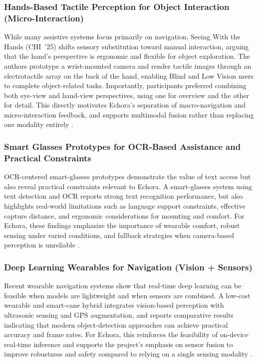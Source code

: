 \subsubsection{Hands-Based Tactile Perception for Object Interaction (Micro-Interaction)}
\label{subsec:lit_hands}

While many assistive systems focus primarily on navigation, Seeing With the Hands (CHI~’25) shifts sensory substitution toward manual interaction, arguing that the hand’s perspective is ergonomic and flexible for object exploration. The authors prototype a wrist-mounted camera and render tactile images through an electrotactile array on the back of the hand, enabling Blind and Low Vision users to complete object-related tasks. Importantly, participants preferred combining both eye-view and hand-view perspectives, using one for overview and the other for detail. This directly motivates Echora’s separation of macro-navigation and micro-interaction feedback, and supports multimodal fusion rather than replacing one modality entirely \cite{seeing_with_the_hands_chi25}.

\subsubsection{Smart Glasses Prototypes for OCR-Based Assistance and Practical Constraints}
\label{subsec:lit_ocr_glasses}

OCR-centered smart-glasses prototypes demonstrate the value of text access but also reveal practical constraints relevant to Echora. A smart-glasses system using text detection and OCR reports strong text recognition performance, but also highlights real-world limitations such as language support constraints, effective capture distance, and ergonomic considerations for mounting and comfort. For Echora, these findings emphasize the importance of wearable comfort, robust sensing under varied conditions, and fallback strategies when camera-based perception is unreliable \cite{smart_glasses_for_blind_people}.

\subsubsection{Deep Learning Wearables for Navigation (Vision + Sensors)}
\label{subsec:lit_dl_wearables}

Recent wearable navigation systems show that real-time deep learning can be feasible when models are lightweight and when sensors are combined. A low-cost wearable and smart-cane hybrid integrates vision-based perception with ultrasonic sensing and GPS augmentation, and reports comparative results indicating that modern object-detection approaches can achieve practical accuracy and frame rates. For Echora, this reinforces the feasibility of on-device real-time inference and supports the project’s emphasis on sensor fusion to improve robustness and safety compared to relying on a single sensing modality \cite{kumar_jain_2022}.

